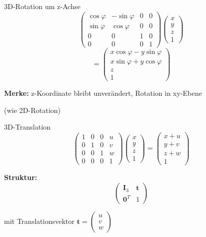 \documentclass[a4paper, fontsize=7pt]{scrartcl}
\begin{document}
\begin{mainbox}{3D-Rotation um z-Achse}
\[\begin{pmatrix}
\cos\varphi & -\sin\varphi & 0 & 0 \\
\sin\varphi & \cos\varphi & 0 & 0 \\
0 & 0 & 1 & 0 \\
0 & 0 & 0 & 1
\end{pmatrix} \begin{pmatrix} x \\ y \\ z \\ 1 \end{pmatrix} \]
\[= \begin{pmatrix} x\cos\varphi - y\sin\varphi \\ x\sin\varphi + y\cos\varphi \\ z \\ 1 \end{pmatrix}\]

\textbf{Merke:} z-Koordinate bleibt unverändert, Rotation in xy-Ebene

(wie 2D-Rotation)
\end{mainbox}

\begin{mainbox}{3D-Translation}
$$\begin{pmatrix}
1 & 0 & 0 & u \\
0 & 1 & 0 & v \\
0 & 0 & 1 & w \\
0 & 0 & 0 & 1
\end{pmatrix} \begin{pmatrix} x \\ y \\ z \\ 1 \end{pmatrix} = \begin{pmatrix} x + u \\ y + v \\ z + w \\ 1 \end{pmatrix}$$

\textbf{Struktur:}
$$\begin{pmatrix} \mathbf{I}_3 & \mathbf{t} \\ \mathbf{0}^T & 1 \end{pmatrix}$$

mit Translationsvektor $\mathbf{t} = \begin{pmatrix} u \\ v \\ w \end{pmatrix}$
\end{mainbox}
\end{document}
